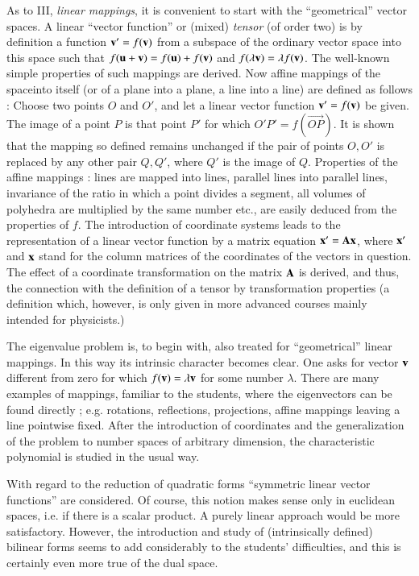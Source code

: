 As to III, \textit{linear mappings}, it is convenient to start with
the ``geometrical'' vector spaces. A linear ``vector function'' or
(mixed) \textit{tensor} (of order two) is by definition a function
$\mathbf{v}' = f(\mathbf{v})$ from a subspace of the ordinary vector space into this
space such that $f(\mathbf{u} + \mathbf{v}) = f(\mathbf{u}) + f(\mathbf{v})$ and $f(\lambda \mathbf{v}) =
\lambda f (\mathbf{v})$. The well-known simple properties of such mappings
are derived. Now affine mappings of the space\pageoriginale into
itself (or of a plane into a plane, a line into a line) are defined as
follows : Choose two points $O$ and $O'$, and let a linear vector
function $\mathbf{v}' = f(\mathbf{v})$ be given. The image of a point $P$ is that
point $P'$ for which $O'P' = f(\vec{OP})$. It is shown that the
mapping so defined remains unchanged if the pair of points $O,O'$ is
replaced by any other pair $Q,Q'$, where $Q'$ is the image of
$Q$. Properties of the affine mappings : lines are mapped into lines,
parallel lines into parallel lines, invariance of the ratio in which a
point divides a segment, all volumes of polyhedra are multiplied by
the same number etc., are easily deduced from the properties  of
$f$. The introduction of coordinate systems leads to the
representation of a linear vector function by a matrix equation $\mathbf{x}'
=\mathbf{A} \mathbf{x}$, where $\mathbf{x}'$ and $\mathbf{x}$ stand for the column matrices of the
coordinates of the vectors in question. The effect of a coordinate
transformation on the matrix $\mathbf{A}$ is derived, and thus, the
connection with the definition of a tensor by transformation
properties (a definition which, however, is only given in more
advanced courses mainly intended for physicists.)

The eigenvalue problem is, to begin with, also treated for
``geometrical'' linear mappings. In this way its intrinsic character
becomes clear. One asks for vector $\mathbf{v}$ different from zero for which
$f(\mathbf{v}) = \lambda \mathbf{v}$ for some number $\lambda$. There are many
examples of mappings, familiar to the students, where the eigenvectors
can be found directly ; e.g. rotations, reflections, projections,
affine mappings leaving a line pointwise fixed. After the introduction
of coordinates and the generalization of the problem to number spaces
of arbitrary dimension, the characteristic polynomial is studied in
the usual way.

With regard to the reduction of quadratic forms ``symmetric linear
vector functions'' are considered. Of course, this notion makes  sense
only in euclidean spaces, i.e. if there is a scalar product. A purely
linear approach would be more satisfactory. However, the introduction
and study of (intrinsically defined) bilinear forms seems to add
considerably to the students' difficulties, and this is certainly even
more true of the dual space.

